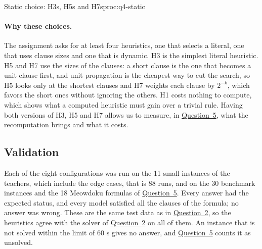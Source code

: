 \begin{pseudo}{Static choice: H3s, H5s and H7s}{proc:q4-static}
\end{pseudo}

\paragraph{Why these choices.} The assignment asks for at least four heuristics, one that selects a literal, one that uses clause sizes and one that is dynamic. H3 is the simplest literal heuristic. H5 and H7 use the sizes of the clauses: a short clause is the one that becomes a unit clause first, and unit propagation is the cheapest way to cut the search, so H5 looks only at the shortest clauses and H7 weights each clause by $2^{-k}$, which favors the short ones without ignoring the others. H1 costs nothing to compute, which shows what a computed heuristic must gain over a trivial rule. Having both versions of H3, H5 and H7 allows us to measure, in \hyperref[sec:q5]{Question~5}, what the recomputation brings and what it costs.

\subsection{Validation}

Each of the eight configurations was run on the 11 small instances of the teachers, which include the edge cases, that is 88 runs, and on the 30 benchmark instances and the 18 Meowdoku formulas of \hyperref[sec:q5]{Question~5}. Every answer had the expected status, and every model satisfied all the clauses of the formula; no answer was wrong. These are the same test data as in \hyperref[sec:q2]{Question~2}, so the heuristics agree with the solver of \hyperref[sec:q2]{Question~2} on all of them. An instance that is not solved within the limit of 60 s gives no answer, and \hyperref[sec:q5]{Question~5} counts it as unsolved.
